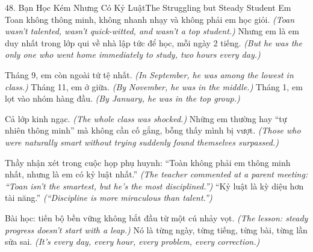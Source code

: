 \begin{truyen}{48. Bạn Học Kém Nhưng Có Kỷ Luật}{The Struggling but Steady Student}
Em Toan không thông minh, không nhanh nhạy và không phải em học giỏi.
\textit{(Toan wasn't talented, wasn't quick-witted, and wasn't a top student.)}
Nhưng em là em duy nhất trong lớp qui về nhà lập tức để học, mỗi ngày 2 tiếng.
\textit{(But he was the only one who went home immediately to study, two hours every day.)}

Tháng 9, em còn ngoài tứ tệ nhất.
\textit{(In September, he was among the lowest in class.)}
Tháng 11, em ở giữa.
\textit{(By November, he was in the middle.)}
Tháng 1, em lọt vào nhóm hàng đầu.
\textit{(By January, he was in the top group.)}

Cả lớp kinh ngạc.
\textit{(The whole class was shocked.)}
Những em thường hay ``tự nhiên thông minh'' mà không cần cố gắng, bỗng thấy mình bị vượt.
\textit{(Those who were naturally smart without trying suddenly found themselves surpassed.)}

Thầy nhận xét trong cuộc họp phụ huynh: ``Toàn không phải em thông minh nhất, nhưng là em có kỷ luật nhất.''
\textit{(The teacher commented at a parent meeting: ``Toan isn't the smartest, but he's the most disciplined.'')}
``Kỷ luật là kỳ diệu hơn tài năng.''
\textit{(``Discipline is more miraculous than talent.'')}

Bài học: tiến bộ bền vững không bắt đầu từ một cú nhảy vọt.
\textit{(The lesson: steady progress doesn't start with a leap.)}
Nó là từng ngày, từng tiếng, từng bài, từng lần sửa sai.
\textit{(It's every day, every hour, every problem, every correction.)}
\end{truyen}

